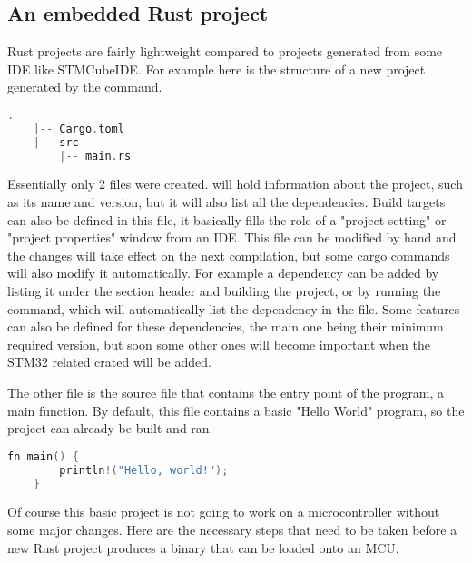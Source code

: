 \subsection{An embedded Rust project}

Rust projects are fairly lightweight compared to projects generated from some IDE like STMCubeIDE. For example here is the structure of a new project generated by the  command.

\begin{lstlisting}[language=C,frame=single,float=!ht,label={lst:rust-project-structure},caption={Rust Project Structure}]
    .
    |-- Cargo.toml
    |-- src
        |-- main.rs

\end{lstlisting}

Essentially only 2 files were created.  will hold information about the project, such as its name and version, but it will also list all the dependencies. Build targets can also be defined in this file, it basically fills the role of a "project setting" or "project properties" window from an IDE. This file can be modified by hand and the changes will take effect on the next compilation, but some cargo commands will also modify it automatically. For example a dependency can be added by listing it under the \mycode{[dependencies]} section header and building the project, or by running the  command, which will automatically list the dependency in the file. Some features can also be defined for these dependencies, the main one being their minimum required version, but soon some other ones will become important when the STM32 related crated will be added.

The other file is the  source file that contains the entry point of the program, a main function. By default, this file contains a basic "Hello World" program, so the project can already be built and ran.

\begin{lstlisting}[language=C,frame=single,float=!ht,label={lst:rust-hello-world},caption={Rust Hello World Porgram}]
    fn main() {
        println!("Hello, world!");
    }
\end{lstlisting}

Of course this basic project is not going to work on a microcontroller without some major changes. Here are the necessary steps that need to be taken before a new Rust project produces a binary that can be loaded onto an MCU.

